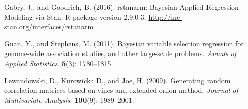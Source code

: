 \documentclass[11pt]{article}
\begin{document}
\noindent

\bibitem Gabry, J., and Goodrich, B. (2016). rstanarm: Bayesian Applied
Regression Modeling via Stan. R package version 2.9.0-3.
\url{http://mc-stan.org/interfaces/rstanarm}

\bibitem Guan, Y., and Stephens, M. (2011). Bayesian variable selection
regression for genome-wide association studies, and other large-scale problems.
\emph{Annals of Applied Statistics}. {\bf 5}(3): 1780--1815.

\bibitem Lewandowski, D., Kurowicka D., and Joe, H. (2009). Generating random
correlation matrices based on vines and extended onion method.
\emph{Journal of Multivariate Analysis}. {\bf 100}(9): 1989--2001.



\end{document}
